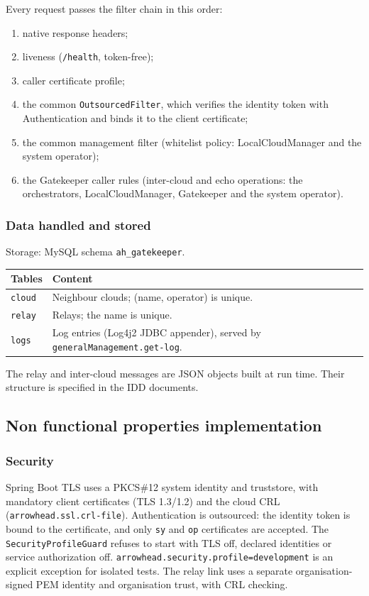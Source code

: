 \documentclass[a4paper]{arrowhead}
\begin{document}
Every request passes the filter chain in this order:
\begin{enumerate}
\item native response headers;
\item liveness (\texttt{/health}, token-free);
\item caller certificate profile;
\item the common \texttt{OutsourcedFilter}, which verifies the identity token with Authentication and binds it to the client certificate;
\item the common management filter (whitelist policy: LocalCloudManager and the system operator);
\item the Gatekeeper caller rules (inter-cloud and echo operations: the orchestrators, LocalCloudManager, Gatekeeper and the system operator).
\end{enumerate}

\subsubsection{Data handled and stored}

Storage: MySQL schema \texttt{ah\_\allowbreak{}gatekeeper}.

\noindent\begin{longtable}{| p{6.4cm} | p{8.8cm} |} \hline
\rowcolor{gray!33} Tables & Content \\ \hline \endhead
\texttt{cloud} & Neighbour clouds; (name, operator) is unique. \\ \hline
\texttt{relay} & Relays; the name is unique. \\ \hline
\texttt{logs} & Log entries (Log4j2 JDBC appender), served by \texttt{generalManagement.\allowbreak{}get-\allowbreak{}log}. \\ \hline
\end{longtable}

The relay and inter-cloud messages are JSON objects built at run time. Their structure is specified in the IDD documents.

\subsection{Non functional properties implementation}

\subsubsection{Security}

Spring Boot TLS uses a PKCS\#12 system identity and truststore, with mandatory client certificates (TLS 1.3/1.2) and the cloud CRL (\texttt{arrowhead.\allowbreak{}ssl.\allowbreak{}crl-\allowbreak{}file}). Authentication is outsourced: the identity token is bound to the certificate, and only \texttt{sy} and \texttt{op} certificates are accepted. The \texttt{SecurityProfileGuard} refuses to start with TLS off, declared identities or service authorization off. \texttt{arrowhead.\allowbreak{}security.\allowbreak{}profile=development} is an explicit exception for isolated tests. The relay link uses a separate organisation-signed PEM identity and organisation trust, with CRL checking.
\end{document}
